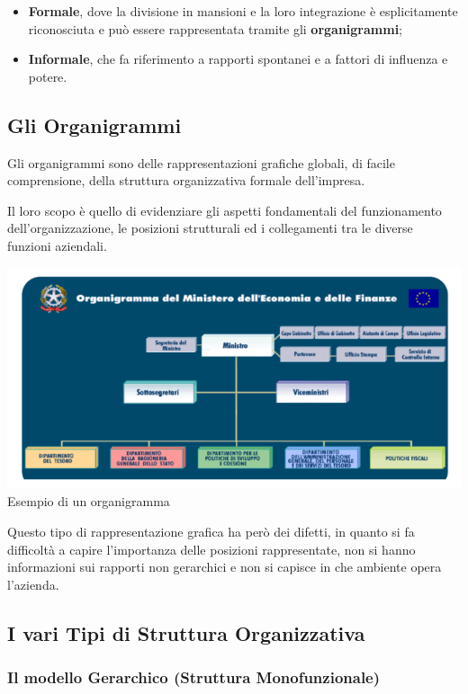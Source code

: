 \documentclass[14pt]{extarticle}
\begin{document}
\begin{itemize}
    \item \textbf{Formale}, dove la divisione in mansioni e la loro integrazione
    è esplicitamente riconosciuta e può essere rappresentata tramite gli
    \textbf{organigrammi};
    \item \textbf{Informale}, che fa riferimento a rapporti spontanei e a
    fattori di influenza e potere. 
\end{itemize}

\subsection{Gli Organigrammi}

Gli organigrammi sono delle rappresentazioni grafiche globali, di facile
comprensione, della struttura organizzativa formale dell'impresa.

Il loro scopo è quello di evidenziare gli aspetti fondamentali del funzionamento
dell'organizzazione, le posizioni strutturali ed i collegamenti tra le diverse
funzioni aziendali.
\begin{center}
    \includegraphics[scale = 0.80]{images/Esempio_Organigramma}
    Esempio di un organigramma 
\end{center}
Questo tipo di rappresentazione grafica ha però dei difetti, in quanto si fa
difficoltà a capire l'importanza delle posizioni rappresentate, non si hanno
informazioni sui rapporti non gerarchici e non si capisce in che ambiente opera
l'azienda.

\subsection{I vari Tipi di Struttura Organizzativa}
\subsubsection{Il modello Gerarchico (Struttura Monofunzionale)}
\end{document}
